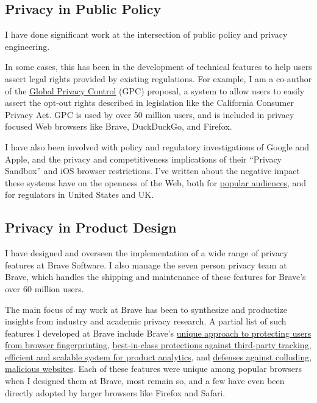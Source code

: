 \documentclass[wideaddress]{vitae}
\begin{document}
  \subsection{Privacy in Public Policy}
  \begin{description}
    \item{\noindent I have done significant work at the intersection of public
    policy and privacy engineering.}

    \item{\noindent In some cases, this has been in the development
    of technical features to help users assert legal rights provided by existing regulations.
    For example, I am a co-author of the \href{https://globalprivacycontrol.org/}{Global Privacy Control} (GPC)
    proposal, a system to allow users to easily
    assert the opt-out rights described in legislation like the California Consumer Privacy Act.
    GPC is used by over 50 million users, and is included in privacy focused
    Web browsers like Brave, DuckDuckGo, and Firefox.}

    \item{\noindent I have also been involved with policy and regulatory
    investigations of Google and Apple, and the privacy and competitiveness
    implications of their ``Privacy Sandbox'' and iOS browser restrictions.
    I've written about the negative impact these
    systems have on the openness of the Web, both for \href{https://brave.com/web-standards-at-brave/}{popular audiences},
    and for regulators in United States and UK.}
  \end{description}

  \subsection{Privacy in Product Design}
  \begin{description}
    \item{\noindent I have designed and overseen the implementation of a wide
    range of privacy features at Brave Software. I also manage the
    seven person privacy team at Brave, which handles
    the shipping and maintenance of these features for Brave's over 60 million users.}

    \item{\noindent The main focus of my work at Brave has been to synthesize and productize
    insights from industry and academic privacy research. A partial
    list of such features I developed at Brave include Brave's
    \href{https://brave.com/privacy-updates/3-fingerprint-randomization/}{unique approach to protecting users from browser fingerprinting},
    \href{https://brave.com/privacy-updates/7-ephemeral-storage/}{best-in-class protections against third-party tracking},
    \href{https://brave.com/privacy-updates/19-star/}{efficient and scalable system for product analytics}, and
    \href{https://brave.com/privacy-updates/13-pool-party-side-channels/}{defenses against colluding, malicious websites}.
    Each of these features were unique among popular browsers when I designed
    them at Brave, most remain so, and a few have even been directly adopted by larger
    browsers like Firefox and Safari.}
  \end{description}
\end{document}
